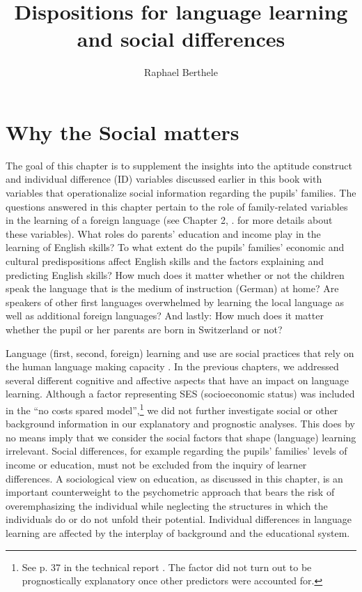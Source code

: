 \documentclass[output=paper]{langsci/langscibook}
\author{Raphael Berthele\affiliation{University of Fribourg, Institut de Plurilinguisme}\orcid{}}
\title{Dispositions for language learning and social differences}
\begin{document}
\maketitle 


\section{Why the Social matters}

The goal of this chapter is to supplement the insights into the aptitude construct and individual difference (ID) variables discussed earlier in this book with variables that operationalize social information regarding the pupils’ families. The questions answered in this chapter pertain to the role of family-related variables in the learning of a foreign language (see Chapter 2, . for more details about these variables). What roles do parents’ education and income play in the learning of English skills? To what extent do the pupils' families' economic and cultural predispositions affect English skills and the factors explaining and predicting English skills? How much does it matter whether or not the children speak the language that is the medium of instruction (German) at home? Are speakers of other first languages overwhelmed by learning the local language as well as additional foreign languages? And lastly: How much does it matter whether the pupil or her parents are born in Switzerland or not?

Language (first, second, foreign) learning and use are social practices that rely on the human language making capacity \citep{Slobin1985}. In the previous chapters, we addressed several different cognitive and affective aspects that have an impact on language learning. Although a factor representing SES (socioeconomic status) was included in the ``no costs spared model'',{\footnote{See p. 37 in the technical report \citep{Vanhove2021}. The factor did not turn out to be prognostically explanatory once other predictors were accounted for.}} we did not further investigate social or other background information in our explanatory and prognostic analyses. This does by no means imply that we consider the social factors that shape (language) learning irrelevant. Social differences, for example regarding the pupils’ families’ levels of income or education, must not be excluded from the inquiry of learner differences. A sociological view on education, as discussed in this chapter, is an important counterweight to the psychometric approach that bears the risk of overemphasizing the individual while neglecting the structures in which the individuals do or do not unfold their potential. Individual differences in language learning are affected by the interplay of background and the educational system. 
\end{document}

